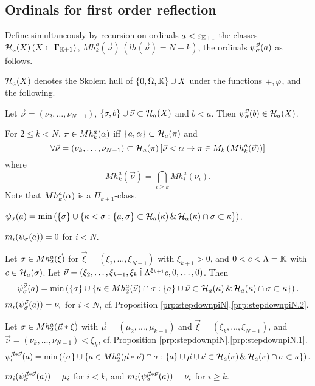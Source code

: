 \documentclass{article}
\newcommand{\mK}{\mathbb{K}}
\begin{document}
\subsection{Ordinals for first order reflection}

\bdf\label{df:HKPpiN}
{\rm
Define simultaneously by recursion on ordinals $a<\veps_{\mK+1}$ the classes
 $\calh_{a}(X)\, (X\subset \Gam_{\mK+1})$, $Mh_{k}^{a}(\vec{\nu})\,(lh(\vec{\nu})=N-k)$,
  the ordinals $\psi_{\sigma}^{\vec{\nu}}(a)$ as follows.

\benu
\item
${\cal H}_{a}(X)$ denotes the Skolem hull of $\{0,\Ome,\mK\}\cup X$ under the functions
$+, \varphi$, and the following.

 Let $\vec{\nu}=(\nu_{2}, \ldots,\nu_{N-1})$,
 $\{\sigma,b\}\cup\vec{\nu}\subset{\cal H}_{a}(X)$ and 
 $b<a$.
 Then $\psi_{\sigma}^{\vec{\nu}}(b)\in{\cal H}_{a}(X)$. 


\item

For $2\leq k<N$, 
$\pi\in Mh_{k}^{a}(\alpha)$ iff $\{a,\alpha\}\subset{\cal H}_{a}(\pi)$ and
\[
\forall\vec{\nu}=(\nu_{k},\ldots,\nu_{N-1})\subset{\cal H}_{a}(\pi)
\left[
\vec{\nu}<\alpha \to
\pi\in M_{k}\left(
Mh_{k}^{a}(\vec{\nu})
\right)
\right]
\]
where
\[
Mh_{k}^{a}(\vec{\nu})=\bigcap_{i\geq k}Mh_{i}^{a}(\nu_{i})
.\]
Note that $Mh_{k}^{a}(\alpha)$ is a $\Pi_{k+1}$-class.

\item
$\psi_{\sigma}(a)=\min\left(\{\sigma\}\cup
\{\kappa<\sigma : \{a,\sigma\}\subset{\cal H}_{a}(\kappa) \,\&\,
{\cal H}_{a}(\kappa)\cap\sigma\subset\kappa\}\right)$.

$m_{i}(\psi_{\sigma}(a))=0$ for $i<N$.

\item
Let $\sigma\in Mh_{2}^{a}(\vec{\xi})$ for $\vec{\xi}=(\xi_{2},\ldots,\xi_{N-1})$ with $\xi_{k+1}>0$,
and $0<c<\Lam=\mK$ with $c\in{\cal H}_{a}(\sigma)$.
Let $\vec{\nu}=(\xi_{2},\ldots,\xi_{k-1},\xi_{k}\dot{+}\Lambda^{\xi_{k+1}}c,0,\ldots,0)$.
Then
\[
\psi_{\sigma}^{\vec{\nu}}(a)=\min\left(\{\sigma\}\cup
\{\kappa\in Mh_{2}^{a}(\vec{\nu})\cap\sigma: \{a\}\cup\vec{\nu}\subset{\cal H}_{a}(\kappa) \,\&\,
{\cal H}_{a}(\kappa)\cap\sigma\subset\kappa\}
\right).
\]
$m_{i}(\psi_{\sigma}^{\vec{\nu}}(a))=\nu_{i}$ for $i<N$,
cf.\,Proposition \ref{prp:stepdownpiN}.\ref{prp:stepdownpiN.2}.

\item
Let $\sigma\in Mh_{2}^{a}(\vec{\mu}*\vec{\xi})$ with 
$\vec{\mu}=(\mu_{2},\ldots,\mu_{k-1})$ and $\vec{\xi}=(\xi_{k},\ldots,\xi_{N-1})$, and
$\vec{\nu}=(\nu_{k},\ldots,\nu_{N-1})<\xi_{k}$, cf.\,Proposition \ref{prp:stepdownpiN}.\ref{prp:stepdownpiN.1}.
\[
\psi_{\sigma}^{\vec{\mu}*\vec{\nu}}(a)=\min\left(\{\sigma\}\cup
\{\kappa\in Mh_{2}^{a}(\vec{\mu}*\vec{\nu})\cap\sigma: \{a\}\cup\vec{\mu}\cup\vec{\nu}\subset{\cal H}_{a}(\kappa) \,\&\,
{\cal H}_{a}(\kappa)\cap\sigma\subset\kappa\}
\right).
\]

$m_{i}(\psi_{\sigma}^{\vec{\mu}*\vec{\nu}}(a))=\mu_{i}$ for $i< k$, and
$m_{i}(\psi_{\sigma}^{\vec{\mu}*\vec{\nu}}(a))=\nu_{i}$ for $i\geq k$.




\eenu
}
\edf
\end{document}
